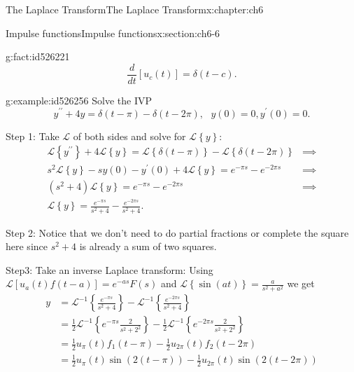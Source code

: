 \documentclass[oneside,10pt,]{book}
\numberwithin{equation}{section}
\numberwithin{equation}{section}
\newcommand{\amp}{&}
\begin{document}
\begin{chapterptx}{The Laplace Transform}{}{The Laplace Transform}{}{}{x:chapter:ch6}
\begin{sectionptx}{Impulse functions}{}{Impulse functions}{}{}{x:section:ch6-6}
\begin{fact}{}{}{g:fact:id526221}%
%
\begin{equation*}
\frac{d}{dt}\left[u_{c}(t)\right]=\delta\left(t-c\right).
\end{equation*}
\end{fact}
\begin{example}{}{g:example:id526256}%
Solve the IVP%
\begin{equation*}
y^{\prime\prime}+4y=\delta\left(t-\pi\right)-\delta\left(t-2\pi\right),\,\,\,\,y(0)=0,y^{\prime}(0)=0.
\end{equation*}
%
\par
Step 1: Take \(\mathcal{L}\) of both sides and solve for \(\mathcal{L}\left\{ y\right\} \):%
\begin{align*}
\mathcal{L}\left\{ y^{\prime\prime}\right\} +4\mathcal{L}\left\{ y\right\} =\mathcal{L}\left\{ \delta\left(t-\pi\right)\right\} -\mathcal{L}\left\{ \delta\left(t-2\pi\right)\right\}  \amp \implies\\
s^{2}\mathcal{L}\left\{ y\right\} -sy(0)-y^{\prime}(0)+4\mathcal{L}\left\{ y\right\} =e^{-\pi s}-e^{-2\pi s} \amp \implies\\
\left(s^{2}+4\right)\mathcal{L}\left\{ y\right\} =e^{-\pi s}-e^{-2\pi s} \amp \implies\\
\mathcal{L}\left\{ y\right\} =\frac{e^{-\pi s}}{s^{2}+4}-\frac{e^{-2\pi s}}{s^{2}+4}.
\end{align*}
%
\par
Step 2: Notice that we don't need to do partial fractions or complete the square here since \(s^{2}+4\) is already a sum of two squares.%
\par
Step3: Take an inverse Laplace transform: Using \(\mathcal{L}\left[u_{a}(t)f(t-a)\right]=e^{-as}F(s)\) and \(\mathcal{L}\left\{ \sin(at)\right\} =\frac{a}{s^{2}+a^{2}}\) we get%
\begin{align*}
y \amp =\mathcal{L}^{-1}\left\{ \frac{e^{-\pi s}}{s^{2}+4}\right\} -\mathcal{L}^{-1}\left\{ \frac{e^{-2\pi s}}{s^{2}+4}\right\} \\
\amp =\frac{1}{2}\mathcal{L}^{-1}\left\{ e^{-\pi s}\frac{2}{s^{2}+2^{2}}\right\} -\frac{1}{2}\mathcal{L}^{-1}\left\{ e^{-2\pi s}\frac{2}{s^{2}+2^{2}}\right\} \\
\amp =\frac{1}{2}u_{\pi}(t)f_{1}\left(t-\pi\right)-\frac{1}{2}u_{2\pi}(t)f_{2}\left(t-2\pi\right)\\
\amp =\frac{1}{2}u_{\pi}(t)\sin\left(2\left(t-\pi\right)\right)-\frac{1}{2}u_{2\pi}(t)\sin\left(2\left(t-2\pi\right)\right)
\end{align*}

\end{example}
\end{sectionptx}
\end{chapterptx}
\end{document}
